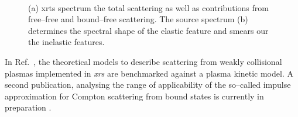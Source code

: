 \documentclass[10pt]{scrartcl}
\begin{document}
\begin{figure}[ht]
  \begin{center}
    \\
  \end{center}
  \caption{(a) \gls{xrts} spectrum the total scattering as well as contributions
  from free--free and  bound--free scattering. The source spectrum (b) determines the spectral shape of the elastic
feature and smears our the inelastic features.}
  \label{fig:xrts_spectrum_and_source}
\end{figure}

In Ref.~\cite{Rozmus2017_submitted}, the theoretical models to describe
scattering from weakly collisional plasmas implemented in \textit{xrs} are
benchmarked against a plasma kinetic model. A second publication, analysing the
range of applicability of the so--called impulse approximation for Compton
scattering from bound states is currently in preparation \cite{Bell2017_prep}.
%
\FloatBarrier
\end{document}
